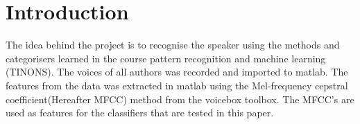 \section{Introduction}

The idea behind the project is to recognise the speaker using the methods and categorisers learned in the course pattern recognition and machine learning (TINONS). The voices of all authors was recorded and imported to matlab. The features from the data was extracted in matlab using the Mel-frequency cepstral coefficient(Hereafter MFCC) method from the voicebox toolbox. The MFCC's are used as features for the classifiers that are tested in this paper.

